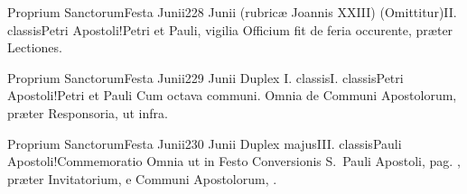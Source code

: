 \documentclass[nocturnale-romanum.tex]{subfiles}
\begin{document}
	{Proprium Sanctorum}{Festa Junii}{2}{28 Junii (rubricæ Joannis XXIII)}
	{(Omittitur)}{II. classis}{Petri Apostoli!Petri et Pauli, vigilia}
	{}
	{Officium fit de feria occurente, præter Lectiones.}

	{Proprium Sanctorum}{Festa Junii}{2}{29 Junii}
	{Duplex I. classis}{I. classis}{Petri Apostoli!Petri et Pauli}
	{Cum octava communi. Omnia de Communi Apostolorum, præter Responsoria, ut infra.}
	{}
\tedeumrubric

	{Proprium Sanctorum}{Festa Junii}{2}{30 Junii}
	{Duplex majus}{III. classis}{Pauli Apostoli!Commemoratio}
	{Omnia ut in Festo Conversionis S.\ Pauli Apostoli, pag. \pageref{M-0125}, præter Invitatorium, e Communi Apostolorum, \pageref{M-APEX}.}
	{}
\end{document}

